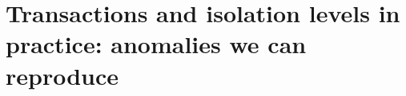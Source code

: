 \chapter{Transactions and isolation levels in practice: anomalies we can reproduce}
\label{ch:transactions-and-isolation-levels-in}

